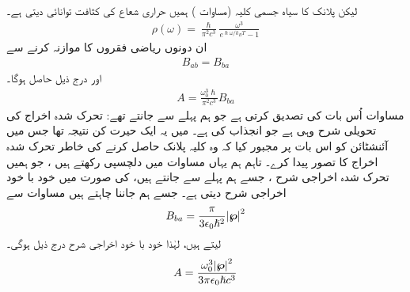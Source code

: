 لیکن پلانک کا سیاہ جسمی کلیہ  (مساوات )   ہمیں حراری شعاع کی کثافت توانائی دیتی ہے۔
\begin{align}
	\rho(\omega) = \frac{\hslash}{\pi^2c^3}\frac{\omega^3}{e^{\hslash\omega/k_BT}-1}
\end{align}
ان دونوں ریاضی فقروں  کا موازنہ کرنے سے 
\begin{align}\label{مساوات_تابع_مضطرب_برابر_شرح}
	B_{ab} = B_{ba}
\end{align}
اور درج ذیل حاصل ہوگا۔
\begin{align}\label{مساوات_تابع_مضطرب_شرح_خود_با_خود_اخراج}
	A = \frac{\omega^3_0\hslash}{\pi^2c^3}B_{ba}
\end{align}
مساوات    اُس بات کی تصدیق کرتی ہے جو ہم پہلے سے جانتے تھے:  تحرک شدہ اخراج کی تحویلی شرح وہی ہے جو انجذاب کی ہے۔ میں یہ ایک حیرت کن نتیجہ تھا جس میں آئنشٹائن کو اس بات پر مجبور کیا کہ وہ کلیہ پلانک حاصل کرنے کی خاطر تحرک شدہ اخراج کا تصور   پیدا  کرے۔  تاہم ہم یہاں  مساوات  میں دلچسپی رکھتے ہیں ،  جو ہمیں تحرک شدہ اخراجی شرح ،  جسے ہم پہلے سے جانتے ہیں،  کی صورت میں خود با خود اخراجی شرح  دیتی ہے۔ جسے ہم جاننا چاہتے ہیں مساوات  سے
\begin{align}
	B_{ba} = \frac{\pi}{3\epsilon_0\hslash^2}\abs{{{\boldsymbol{\wp}}}}^2
\end{align}
لیتے ہیں، لہٰذا    خود با خود اخراجی شرح درج ذیل ہوگی۔
\begin{align}\label{مساوات_تابع_مضطرب_خود_با_خود_شرح_حتمی}
	A = \frac{\omega^3_0\abs{{{\boldsymbol{\wp}}}}^2}{3\pi\epsilon_0\hslash c^3}
\end{align}

